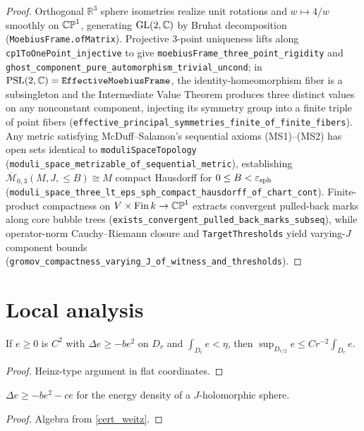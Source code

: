\begin{proof}\leanok Orthogonal $\mathbb{R}^3$ sphere isometries realize unit rotations and $w\mapsto 4/w$ smoothly on $\mathbb{CP}^1$, generating $\mathrm{GL}(2,\mathbb{C})$ by Bruhat decomposition (\texttt{MoebiusFrame.ofMatrix}). Projective 3-point uniqueness lifts along \texttt{cp1ToOnePoint\_injective} to give \texttt{moebiusFrame\_three\_point\_rigidity} and \texttt{ghost\_component\_pure\_automorphism\_trivial\_uncond}; in $\mathrm{PSL}(2,\mathbb{C})=\texttt{EffectiveMoebiusFrame}$, the identity-homeomorphism fiber is a subsingleton and the Intermediate Value Theorem produces three distinct values on any nonconstant component, injecting its symmetry group into a finite triple of point fibers (\texttt{effective\_principal\_symmetries\_finite\_of\_finite\_fibers}). Any metric satisfying McDuff--Salamon's sequential axioms (MS1)--(MS2) has open sets identical to \texttt{moduliSpaceTopology} (\texttt{moduli\_space\_metrizable\_of\_sequential\_metric}), establishing $\overline{\mathcal{M}}_{0,3}(M,J,\le B)\cong M$ compact Hausdorff for $0\le B<\varepsilon_{\mathrm{sph}}$ (\texttt{moduli\_space\_three\_lt\_eps\_sph\_compact\_hausdorff\_of\_chart\_cont}). Finite-product compactness on $V\times\mathrm{Fin}\,k\to\mathbb{CP}^1$ extracts convergent pulled-back marks along core bubble trees (\texttt{exists\_convergent\_pulled\_back\_marks\_subseq}), while operator-norm Cauchy--Riemann closure and \texttt{TargetThresholds} yield varying-$J$ component bounds (\texttt{gromov\_compactness\_varying\_J\_of\_witness\_and\_thresholds}).\end{proof}

\chapter{Local analysis}

\begin{lemma}
\label{a01_mean_value}
\leanok
If $e\ge0$ is $C^2$ with $\Delta e\ge-be^2$ on $D_r$ and $\int_{D_r}e<\eta$, then
$\sup_{D_{r/2}}e\le Cr^{-2}\int_{D_r}e$.
\end{lemma}
\begin{proof}\leanok Heinz-type argument in flat coordinates.\end{proof}

\begin{lemma}
\label{a02_bochner}
\leanok
{}
$\Delta e\ge-be^2-ce$ for the energy density of a $J$-holomorphic sphere.
\end{lemma}
\begin{proof}\leanok Algebra from \cref{cert_weitz}.\end{proof}

